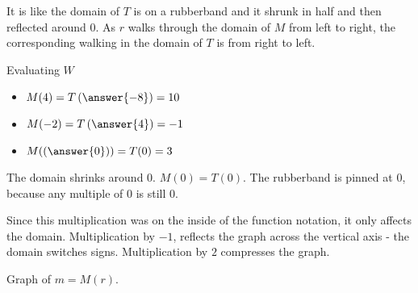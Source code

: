 \documentclass{ximera}
\begin{document}
It is like the domain of $T$ is on a rubberband and it shrunk in half and then reflected around $0$.  As $r$ walks through the domain of $M$ from left to right, the corresponding walking in the domain of $T$ is from right to left.



\begin{example}  Evaluating $W$

\begin{itemize}
\item $M(4) = T\left(\answer{-8}\right) = 10$
\item $M(-2) = T\left(\answer{4}\right) = -1$
\item $M(\left(\answer{0}\right)) = T(0) = 3$
\end{itemize}


\end{example}


The domain shrinks around $0$. $M(0) = T(0)$.  The rubberband is pinned at $0$, because any multiple of $0$ is still $0$.  









Since this multiplication was on the inside of the function notation, it only affects the domain.  Multiplication by $-1$, reflects the graph across the vertical axis - the domain switches signs. Multiplication by $2$ compresses the graph.



Graph of $m = M(r)$.
\end{document}
